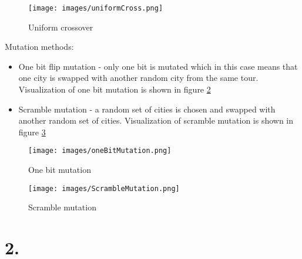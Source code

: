 \documentclass[12pt]{report}
\begin{document}
    \begin{figure}
        \centering
        \texttt{[image: images/uniformCross.png]}
        \caption{Uniform crossover}
        \label{fig:uniformCrossover}
    \end{figure}
    \noindent Mutation methods: \cite{MutationSource}
    \begin{itemize}
        \item One bit flip mutation - only one bit is mutated which in this case means that one city is swapped with another random city from the same tour. Visualization of one bit mutation is shown in figure \ref{fig:OneBitMutation}
        \item Scramble mutation - a random set of cities is chosen and swapped with another random set of cities. Visualization of scramble mutation is shown in figure \ref{fig:ScrambleMutation}
    \end{itemize}

    \begin{figure}
        \centering
        \texttt{[image: images/oneBitMutation.png]}
        \caption{One bit mutation}
        \label{fig:OneBitMutation}
    \end{figure}
    
    \begin{figure}
        \centering
        \texttt{[image: images/ScrambleMutation.png]}
        \caption{Scramble mutation}
        \label{fig:ScrambleMutation}
    \end{figure}
    
    \newpage
    \section{2.}
    
     
	 




    
\end{document}
